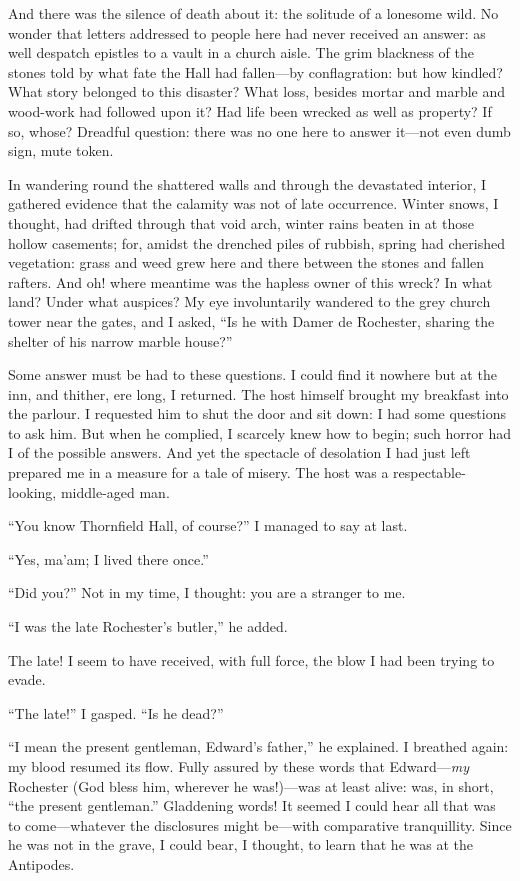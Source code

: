 And there was the silence of death about it: the solitude of a lonesome
wild. No wonder that letters addressed to people here had never
received an answer: as well despatch epistles to a vault in a church
aisle. The grim blackness of the stones told by what fate the Hall had
fallen---by conflagration: but how kindled? What story belonged to this
disaster? What loss, besides mortar and marble and wood-work had
followed upon it? Had life been wrecked as well as property? If so,
whose? Dreadful question: there was no one here to answer it---not even
dumb sign, mute token.

In wandering round the shattered walls and through the devastated
interior, I gathered evidence that the calamity was not of late
occurrence. Winter snows, I thought, had drifted through that void
arch, winter rains beaten in at those hollow casements; for, amidst the
drenched piles of rubbish, spring had cherished vegetation: grass and
weed grew here and there between the stones and fallen rafters. And oh!
where meantime was the hapless owner of this wreck? In what land? 
Under what auspices? My eye involuntarily wandered to the grey church
tower near the gates, and I asked, \enquote{Is he with Damer de
 Rochester, sharing the shelter of his narrow marble house?}

Some answer must be had to these questions. I could find it nowhere but
at the inn, and thither, ere long, I returned. The host himself brought
my breakfast into the parlour. I requested him to shut the door and sit
down: I had some questions to ask him. But when he complied, I scarcely
knew how to begin; such horror had I of the possible answers. And yet
the spectacle of desolation I had just left prepared me in a measure for
a tale of misery. The host was a respectable-looking, middle-aged man.

\enquote{You know Thornfield Hall, of course?} I managed to say at last.

\enquote{Yes, ma'am; I lived there once.}

\enquote{Did you?} Not in my time, I thought: you are a stranger to me.

\enquote{I was the late \Mr{} Rochester's butler,} he added.

The late! I seem to have received, with full force, the blow I had been
trying to evade.

\enquote{The late!} I gasped. \enquote{Is he dead?}

\enquote{I mean the present gentleman, \Mr{} Edward's father,} he
explained. I breathed again: my blood resumed its flow. Fully assured
by these words that \Mr{} Edward---\emph{my} \Mr{} Rochester (God bless him,
wherever he was!)---was at least alive: was, in short, \enquote{the
present gentleman.} Gladdening words! It seemed I could hear all that
was to come---whatever the disclosures might be---with comparative
tranquillity. Since he was not in the grave, I could bear, I thought,
to learn that he was at the Antipodes.

